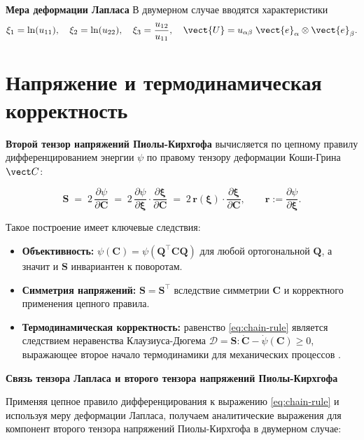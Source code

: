 \textbf{Мера деформации Лапласа}
В двумерном случае вводятся характеристики
\begin{equation}
\xi_1 = \ln(u_{11}),\quad \xi_2 = \ln(u_{22}),\quad \xi_3 = \frac{u_{12}}{u_{11}}, 
\quad \vect{U} = u_{\alpha\beta} \; \vect{e}_{\alpha} \otimes \vect{e}_{\beta}.
\label{eq:laplace_coords}
\end{equation}



\section{Напряжение и термодинамическая корректность}
\textbf{Второй тензор напряжений Пиолы-Кирхгофа} вычисляется по цепному правилу дифференцированием энергии \(\psi\) 
по правому тензору деформации Коши-Грина \(\vect C\):

\begin{equation}
  \mathbf{S} \;=\; 2\,\frac{\partial \psi}{\partial \mathbf{C}}
  \;=\; 2\,\frac{\partial \psi}{\partial \boldsymbol\xi} \cdot \frac{\partial \boldsymbol\xi}{\partial \mathbf{C}}
  \;=\; 2\,\mathbf{r}(\boldsymbol\xi)\cdot\frac{\partial \boldsymbol\xi}{\partial \mathbf{C}},
  \qquad \mathbf{r}:=\frac{\partial \psi}{\partial \boldsymbol\xi}.
  \label{eq:chain-rule}
\end{equation}

Такое построение имеет ключевые следствия:
\begin{itemize}
  \item \textbf{Объективность:} $\psi(\mathbf{C})=\psi(\mathbf{Q}^\top\mathbf{C}\mathbf{Q})$ для любой ортогональной $\mathbf{Q}$, а значит и $\mathbf{S}$ инвариантен к поворотам.
  \item \textbf{Симметрия напряжений:} $\mathbf{S}=\mathbf{S}^\top$ вследствие симметрии $\mathbf{C}$ и корректного применения цепного правила.
  \item \textbf{Термодинамическая корректность:} равенство \eqref{eq:chain-rule} является следствием неравенства Клаузиуса-Дюгема 
  $\mathcal{D} = \mathbf{S} : \dot{\mathbf{C}} - \dot{\psi}(\mathbf{C}) \geq 0$, 
  выражающее второе начало термодинамики для механических процессов \cite{truesdell1984historical,truesdell2004nonlinear}.
\end{itemize}

\textbf{Связь тензора Лапласа и второго тензора напряжений Пиолы-Кирхгофа}

Применяя цепное правило дифференцирования к выражению \eqref{eq:chain-rule} и используя меру деформации Лапласа, 
получаем аналитические выражения для компонент второго тензора напряжений Пиолы-Кирхгофа в двумерном случае:

